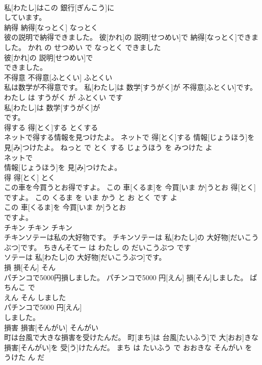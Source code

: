 \documentclass[8pt]{extreport}
\begin{document}
\begin{CJK}{UTF8}{min}
\\	私[わたし]はこの 銀行[ぎんこう]に
\\	しています。			
\\	納得	納得[なっとく]	なっとく	
\\	彼の説明で納得できました。	彼[かれ]の 説明[せつめい]で 納得[なっとく]できました。	かれ の せつめい で なっとく できました	
\\	彼[かれ]の 説明[せつめい]で
\\	できました。			
\\	不得意	不得意[ふとくい]	ふとくい	
\\	私は数学が不得意です。	私[わたし]は 数学[すうがく]が 不得意[ふとくい]です。	わたし は すうがく が ふとくい です	
\\	私[わたし]は 数学[すうがく]が
\\	です。			
\\	得する	得[とく]する	とくする	
\\	ネットで得する情報を見つけたよ。	ネットで 得[とく]する 情報[じょうほう]を 見[み]つけたよ。	ねっと で とく する じょうほう を みつけた よ	
\\	ネットで
\\	情報[じょうほう]を 見[み]つけたよ。			
\\	得	得[とく]	とく	
\\	この車を今買うとお得ですよ。	この 車[くるま]を 今買[いま か]うとお 得[とく]ですよ。	この くるま を いま かう と お とく です よ	
\\	この 車[くるま]を 今買[いま か]うとお
\\	ですよ。			
\\	チキン	チキン	チキン	
\\	チキンソテーは私の大好物です。	チキンソテーは 私[わたし]の 大好物[だいこうぶつ]です。	ちきんそてー は わたし の だいこうぶつ です	
\\	ソテーは 私[わたし]の 大好物[だいこうぶつ]です。			
\\	損	損[そん]	そん	
\\	パチンコで5000円損しました。	パチンコで5000 円[えん] 損[そん]しました。	ぱちんこ で 
\\	えん そん しました	
\\	パチンコで5000 円[えん]
\\	しました。			
\\	損害	損害[そんがい]	そんがい	
\\	町は台風で大きな損害を受けたんだ。	町[まち]は 台風[たいふう]で 大[おお]きな 損害[そんがい]を 受[う]けたんだ。	まち は たいふう で おおきな そんがい を うけた ん だ	

\end{CJK}
\end{document}
